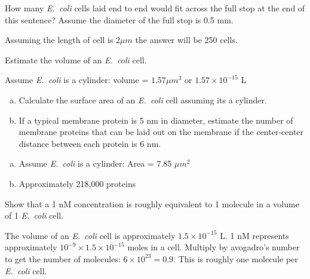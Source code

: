 \documentclass[12pt]{article}
\begin{document}
\begin{question}
How many {\em E.\ coli} cells laid end to end would fit across the full stop at the end of this sentence? Assume the diameter of the full stop is 0.5 mm.
\end{question}
\begin{solution}
Assuming the length of cell is 2$\mu m$ the answer will be 250 cells.
\end{solution}


\begin{question}
Estimate the volume of an {\em E.\ coli} cell.
\end{question}
\begin{solution}
Assume {\em E.\ coli} is a cylinder: volume = $1.57 \mu m^3$ or $1.57 \times 10^{-15}$ L
\end{solution}


\begin{question}
\begin{enumerate}[a)]
\item Calculate the surface area of an {\em E.\ coli} cell assuming its a cylinder.

\item If a typical membrane protein is 5 nm in diameter, estimate the number of membrane proteins that can be laid out on the membrane if the center-center distance between each protein is 6 nm.
\end{enumerate}
\end{question}
\begin{solution}
\begin{enumerate}[a)]
\item Assume {\em E.\ coli} is a cylinder: Area = 7.85 $\mu m^2$
\item Approximately 218,000 proteins
\end{enumerate}
\end{solution}


\begin{question}
Show that a 1 nM concentration is roughly equivalent to 1 molecule in a volume of 1 {\em E.\ coli} cell.
\end{question}
\begin{solution}
The volume of an {\em E.\ coli} cell is approximately $1.5 \times 10^{-15}$ L. 1 nM represents approximately $10^{-9} \times 1.5 \times 10^{-15}$ moles in a cell. Multiply by avogadro's number to get the number of molecules: $6 \times 10^{23} = 0.9$. This is roughly one molecule per {\em E.\ coli} cell.
\end{solution}
\end{document}
